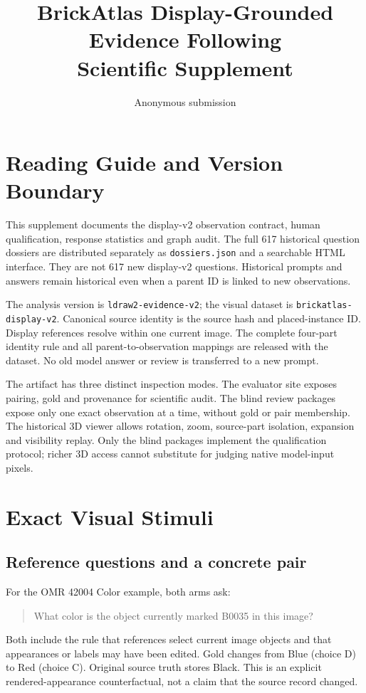 \documentclass[10pt,twocolumn,letterpaper]{article}
\title{BrickAtlas Display-Grounded Evidence Following\\Scientific Supplement}
\author{Anonymous submission}
\begin{document}
\maketitle

\section{Reading Guide and Version Boundary}
This supplement documents the display-v2 observation contract,
human qualification, response statistics and graph audit. The full
617 historical question dossiers are distributed separately as
\texttt{dossiers.json} and a searchable HTML interface. They are not
617 new display-v2 questions. Historical prompts and answers remain
historical even when a parent ID is linked to new observations.

The analysis version is \texttt{ldraw2-evidence-v2}; the visual dataset
is \texttt{brickatlas-display-v2}. Canonical source identity is the
source hash and placed-instance ID. Display references resolve within
one current image. The complete four-part identity rule and all
parent-to-observation mappings are released with the dataset.
No old model answer or review is transferred to a new prompt.

The artifact has three distinct inspection modes. The evaluator site
exposes pairing, gold and provenance for scientific audit. The blind
review packages expose only one exact observation at a time, without
gold or pair membership. The historical 3D viewer allows rotation,
zoom, source-part isolation, expansion and visibility replay.
Only the blind packages implement the qualification protocol; richer
3D access cannot substitute for judging native model-input pixels.

\section{Exact Visual Stimuli}
\subsection{Reference questions and a concrete pair}
For the OMR 42004 Color example, both arms ask:
\begin{quote}\small
What color is the object currently marked B0035 in this image?
\end{quote}
Both include the rule that references select current image objects and
that appearances or labels may have been edited. Gold changes from
Blue (choice D) to Red (choice C). Original source truth stores Black.
This is an explicit rendered-appearance counterfactual, not a claim
that the source record changed.
\end{document}
